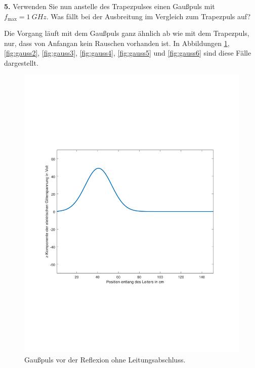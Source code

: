 \documentclass[Protokollheft.tex]{subfiles}
\begin{document}
\begin{framed}
	\noindent \textbf{5.} Verwenden Sie nun anstelle des Trapezpulses einen Gaußpuls
mit $f_{\text{max}}=\SI{1}{GHz}$. Was fällt bei der Ausbreitung im Vergleich
zum Trapezpuls auf?\label{exer:gaussExcitation}
\end{framed}
\noindent
Die Vorgang läuft mit dem Gaußpuls ganz ähnlich ab wie mit dem Trapezpuls, nur, dass von Anfangan kein Rauschen vorhanden ist. In Abbildungen  \ref{fig:gauss1}, \ref{fig:gauss2}, \ref{fig:gauss3}, \ref{fig:gauss4}, \ref{fig:gauss5} und \ref{fig:gauss6} sind diese Fälle dargestellt.
\begin{figure}[ht]
	\centering
	\includegraphics[trim = 20mm 65mm 20mm 65mm, clip,width=0.7\linewidth]{untitled1.pdf}
	\caption{Gaußpuls vor der Reflexion ohne Leitungsabschluss.}\label{fig:gauss1}
\end{figure}
\end{document}
